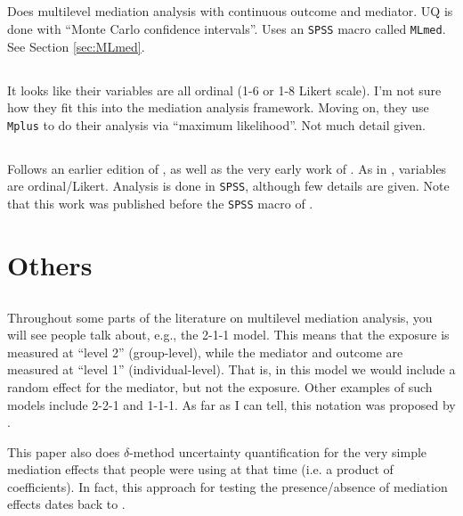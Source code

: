 \documentclass{article}
\begin{document}
\subsection{\citet{Vea19}}

Does multilevel mediation analysis with continuous outcome and mediator. UQ is done with ``Monte Carlo confidence intervals''. Uses an \texttt{SPSS} macro called \texttt{MLmed}. See Section \ref{sec:MLmed}.

\subsection{\citet{Ara21}}

It looks like their variables are all ordinal (1-6 or 1-8 Likert scale). I'm not sure how they fit this into the mediation analysis framework. Moving on, they use \texttt{Mplus} to do their analysis via ``maximum likelihood''. Not much detail given.

\subsection{\citet{Hwa12}}

Follows an earlier edition of \citet{Mac17}, as well as the very early work of \citet{Bar86}. As in \citet{Ara21}, variables are ordinal/Likert. Analysis is done in \texttt{SPSS}, although few details are given. Note that this work was published before the \texttt{SPSS} macro of \citet{Roc19}.


\section{Others}
\label{sec:other}

\subsection{\citet{Kru01}}

Throughout some parts of the literature on multilevel mediation analysis, you will see people talk about, e.g., the 2-1-1 model. This means that the exposure is measured at ``level 2'' (group-level), while the mediator and outcome are measured at ``level 1'' (individual-level). That is, in this model we would include a random effect for the mediator, but not the exposure. Other examples of such models include 2-2-1 and 1-1-1. As far as I can tell, this notation was proposed by \citet{Kru01}.

This paper also does $\delta$-method uncertainty quantification for the very simple mediation effects that people were using at that time (i.e. a product of coefficients). In fact, this approach for testing the presence/absence of mediation effects dates back to \citet{Sob82}.
\end{document}
